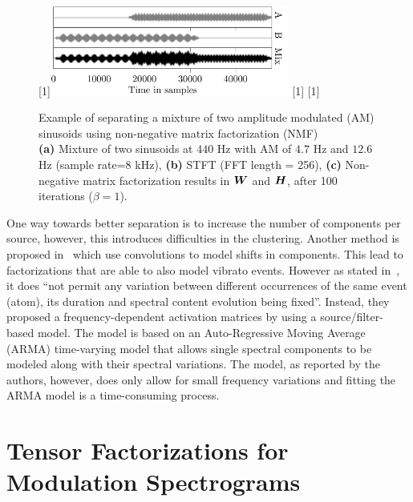 \begin{figure}[H]
\centering
{}%
[1\textwidth]{\includegraphics[width=0.7\textwidth]{Chapters/05_Separation_Known/figures/Timepdf-crop.pdf}}%
\hspace{0.2\textwidth} %
[1\textwidth]{}%
\hspace{0.3\textwidth} %
[1\textwidth]{}%
\caption{Example of separating a mixture of two amplitude modulated (AM) sinusoids using non-negative matrix factorization (NMF)\\ \textbf{(a)} Mixture of two sinusoids at $440$ Hz with AM of $4.7$ Hz and $12.6$ Hz (sample rate=$8$ kHz), \textbf{(b)} STFT (FFT length = 256), \textbf{(c)} Non-negative matrix factorization results in ${\bm{W}}$ and ${\bm{H}}$, after 100 iterations ($\beta = 1$).}
\label{fig:am_tensor_nmf}
\end{figure}

One way towards better separation is to increase the number of components per source, however, this introduces difficulties in the clustering.
Another method is proposed in~\cite{smaragdis04, fitzgerald05s, jaiswal13, rodriguezserrano16} which use convolutions to model shifts in components.
This lead to factorizations that are able to also model vibrato events.
However as stated in~\cite{hennequin11}, it does ``not  permit  any variation  between  different  occurrences  of  the  same event (atom), its duration and spectral content evolution being fixed''. 
Instead, they proposed a frequency-dependent activation matrices by using a source/filter-based model.
The model is based on an Auto-Regressive Moving Average (ARMA) time-varying model that allows single spectral components to be modeled along with their spectral variations. 
The model, as reported by the authors, however, does only allow for small frequency variations and fitting the ARMA model is a time-consuming process.

\section{Tensor Factorizations for Modulation Spectrograms}
\label{sub:am}

